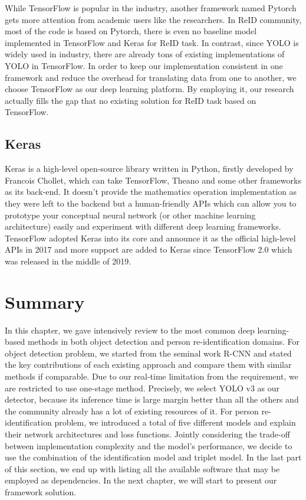 While TensorFlow is popular in the industry, another framework named Pytorch
gets more attention from academic users like the researchers. In ReID
community, most of the code is based on Pytorch, there is even no baseline
model implemented in TensorFlow and Keras for ReID task.
In contrast, since YOLO is widely used in industry, there are already tons
of existing implementations of YOLO in TensorFlow. In order to keep our
implementation consistent in one framework and reduce the overhead for
translating data from one to another, we choose TensorFlow as our deep
learning platform. By employing it, our research actually fills the gap that no
existing solution for ReID task based on TensorFlow.


\subsection{Keras}

Keras \cite{keras-framework} is a high-level open-source library written in
Python, firstly developed by Francois Chollet, which can take TensorFlow,
Theano and some other frameworks as its back-end. It doesn't provide the
mathematics operation implementation as they were left to the backend but a
human-friendly APIs which can allow you to prototype your conceptual
neural network (or other machine learning architecture) easily and experiment
with different deep learning frameworks. TensorFlow adopted Keras into its core
and announce it as the official high-level APIs in 2017 and more support are
added to Keras since TensorFlow 2.0 which was released in the middle of 2019.

\section{Summary}

In this chapter, we gave intensively review to the most common deep
learning-based methods in both object detection and person re-identification
domains.
%
For object detection problem, we started from the seminal work R-CNN
and stated the key contributions of each existing approach and compare them
with similar methods if comparable. Due to our real-time limitation from the
requirement, we are restricted to use one-stage method. Precisely, we select
YOLO v3 as our detector, because its inference time is large margin better than
all the others and the community already has a lot of existing resources of it.
%
For person re-identification problem, we introduced a total of five different 
models and explain their network architectures and loss functions. Jointly 
considering the trade-off between implementation complexity and the model's 
performance, we decide to use the combination of the identification model and 
triplet model.
%
In the last part of this section, we end up with listing all the available
software that may be employed as dependencies. In the next chapter, we 
will start to present our framework solution.

